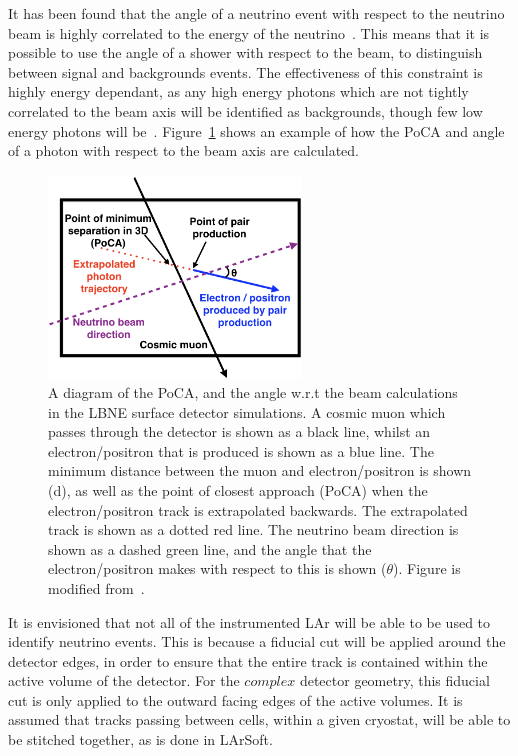It has been found that the angle of a neutrino event with respect to the neutrino beam is highly correlated to the energy of the neutrino~\citep{barker2012muon}. This means that it is possible to use the angle of a shower with respect to the beam, to distinguish between signal and backgrounds events. The effectiveness of this constraint is highly energy dependant, as any high energy photons which are not tightly correlated to the beam axis will be identified as backgrounds, though few low energy photons will be~\citep{LBNE6621}. Figure~\ref{fig:SurfPoCACut} shows an example of how the PoCA and angle of a photon with respect to the beam axis are calculated. \\

\begin{figure}
  \centering
  \includegraphics[width=0.6\textwidth]{PoCA_Beam_Cuts}
  \caption[A diagram of the PoCA, and the angle w.r.t the beam calculations in the LBNE surface detector simulations]
          {A diagram of the PoCA, and the angle w.r.t the beam calculations in the LBNE surface detector simulations. A cosmic muon which passes through the detector is shown as a black line, whilst an electron/positron that is produced is shown as a blue line. The minimum distance between the muon and electron/positron is shown (d), as well as the point of closest approach (PoCA) when the electron/positron track is extrapolated backwards. The extrapolated track is shown as a dotted red line. The neutrino beam direction is shown as a dashed green line, and the angle that the electron/positron makes with respect to this is shown ($\theta$). Figure is modified from~\citep{MartinsThesis}.}
  \label{fig:SurfPoCACut}
\end{figure}

It is envisioned that not all of the instrumented LAr will be able to be used to identify neutrino events. This is because a fiducial cut will be applied around the detector edges, in order to ensure that the entire track is contained within the active volume of the detector. For the $complex$ detector geometry, this fiducial cut is only applied to the outward facing edges of the active volumes. It is assumed that tracks passing between cells, within a given cryostat, will be able to be stitched together, as is done in LArSoft. \\


